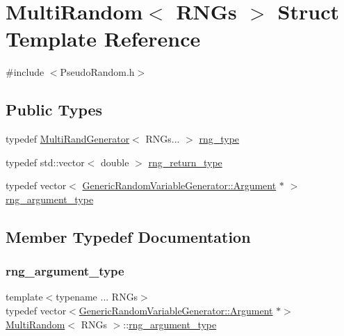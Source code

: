 \hypertarget{struct_multi_random}{}\section{Multi\+Random$<$ R\+N\+Gs $>$ Struct Template Reference}
\label{struct_multi_random}


{\ttfamily \#include $<$Pseudo\+Random.\+h$>$}

\subsection*{Public Types}
\begin{DoxyCompactItemize}
\item 
typedef \hyperlink{class_multi_rand_generator}{Multi\+Rand\+Generator}$<$ R\+N\+Gs... $>$ \hyperlink{struct_multi_random_ab52e2897d9a16b9d00ff5e58f2528220}{rng\+\_\+type}
\item 
typedef std\+::vector$<$ double $>$ \hyperlink{struct_multi_random_a8280971d100a3f24afc0432e3dc58dbb}{rng\+\_\+return\+\_\+type}
\item 
typedef vector$<$ \hyperlink{class_generic_random_variable_generator_1_1_argument}{Generic\+Random\+Variable\+Generator\+::\+Argument} $\ast$ $>$ \hyperlink{struct_multi_random_aeeee5f778d8844b4d7070ca3409ad45d}{rng\+\_\+argument\+\_\+type}
\end{DoxyCompactItemize}


\subsection{Member Typedef Documentation}
\hypertarget{struct_multi_random_aeeee5f778d8844b4d7070ca3409ad45d}{}\label{struct_multi_random_aeeee5f778d8844b4d7070ca3409ad45d} 
\subsubsection{\texorpdfstring{rng\+\_\+argument\+\_\+type}{rng\_argument\_type}}
{\footnotesize\ttfamily template$<$typename ... R\+N\+Gs$>$ \\
typedef vector$<$\hyperlink{class_generic_random_variable_generator_1_1_argument}{Generic\+Random\+Variable\+Generator\+::\+Argument} $\ast$$>$ \hyperlink{struct_multi_random}{Multi\+Random}$<$ R\+N\+Gs $>$\+::\hyperlink{struct_multi_random_aeeee5f778d8844b4d7070ca3409ad45d}{rng\+\_\+argument\+\_\+type}}

